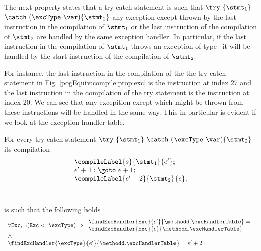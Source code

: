 The next property states that a try catch statement is such that $ \try \ \{ \stmt_1 \} $ $ \catch \ (\excType \ \var )\{ \stmt_2 \}  $ 
any exception except \excType{} thrown by  the last instruction in the compilation of $ \stmt_1 $ or the last instruction of the compilation 
of $ \stmt_2$ are handled by the same exception handler. In particular, if the last instruction in the compilation of
 $ \stmt_1 $ throws an exception of type \excType \  it will be handled by the start instruction of the compilation of $\stmt_2 $.

For instance, the last instruction in the compilation of the the try catch statement  in Fig. \ref{pogEquiv:compile:prop:exc} 
is the instruction at index 27 and the last instruction in the compilation of the try statement is the instruction at index 20. 
We can see that any excepition except \NullPointerExc{} which might be thrown from these instructions 
will be handled in the same way. This in particular is evident if we look at the exception handler table.
 
\begin{compProp10}\label{compile:prop:compProp10}
For every try catch statement $ \try \ \{ \stmt_1 \} \ \catch \ (\excType \ \var )\{ \stmt_2 \}  $ 
its compilation $$
\begin{array}{l} 
\compileLabel{s}{\stmt_1}{e'}; \\
                       e' + 1: \goto \ e + 1; \\
		  
                       \compileLabel{e' + 2 }{\stmt_2}{e };\\
		       \\ \\

 \end{array}$$
is such that the following holds 
$$\begin{array}{l} \forall \mbox{\rm{\texttt{Exc}}},  \neg ( \mbox{\rm{\texttt{Exc}}} <: \excType ) \Rightarrow
  \begin{array}{l}  
         \findExcHandler{\mbox{\rm\tt{Exc}} }{e'}{\methodd.\excHandlerTable} =\\ 
    \findExcHandler{\mbox{\rm\tt{Exc}} }{e}{\methodd.\excHandlerTable}  \\
   \end{array} \\
   \wedge\\
  \findExcHandler{\excType }{e'}{\methodd.\excHandlerTable} = e'+2 \\ 
 \end{array} $$



\end{compProp10}



